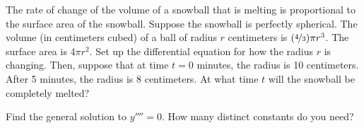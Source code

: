 \begin{exercise}\ansMark
The rate of change of the volume of a snowball that is melting is 
proportional to the surface area of the snowball.  Suppose the
snowball is perfectly spherical.  The volume (in centimeters cubed)
of a ball of radius $r$ centimeters is
$(\nicefrac{4}{3}) \pi r^3$.  The surface area is
$4 \pi r^2$.  Set up the differential equation for how the radius $r$ is changing.
Then, suppose that at time $t=0$ minutes, the radius is 10 centimeters.
After 5 minutes, the radius is 8 centimeters.  At what time $t$ will the 
snowball be completely melted?
\end{exercise}

\begin{exercise}\ansMark%
Find the general solution to $y''''= 0$.  How many distinct constants do you need?
\end{exercise}

\setcounter{exercise}{100}









